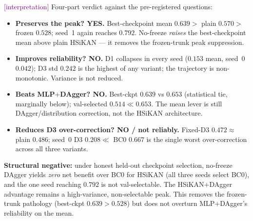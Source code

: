 \documentclass[11pt]{article}
\newcommand{\interp}{\textcolor{purple}{[interpretation]}}
\begin{document}
\interp{} Four-part verdict against the pre-registered questions:
\begin{itemize}[nosep]
\item \textbf{Preserves the peak? YES.} Best-checkpoint mean $0.639>$ plain $0.570>$ frozen $0.528$; seed~1 again
reaches $0.792$. No-freeze \emph{raises} the best-checkpoint mean above plain HSiKAN --- it removes the frozen-trunk
peak suppression.
\item \textbf{Improves reliability? NO.} D1 collapses in every seed ($0.153$ mean, seed~0 $0.042$); D3 std $0.242$
is the highest of any variant; the trajectory is non-monotonic. Variance is not reduced.
\item \textbf{Beats MLP$+$DAgger? NO.} Best-ckpt $0.639$ vs $0.653$ (statistical tie, marginally below);
val-selected $0.514\ll0.653$. The mean lever is still DAgger/distribution correction, not the HSiKAN architecture.
\item \textbf{Reduces D3 over-correction? NO / not reliably.} Fixed-D3 $0.472\approx$ plain $0.486$; seed~0 D3
$0.208\ll$ BC0 $0.667$ is the single worst over-correction across all three variants.
\end{itemize}
\textbf{Structural negative:} under honest held-out checkpoint selection, no-freeze DAgger yields \emph{zero} net
benefit over BC0 for HSiKAN (all three seeds select BC0), and the one seed reaching $0.792$ is not val-selectable.
The HSiKAN$+$DAgger advantage remains a high-variance, non-selectable peak. This removes the frozen-trunk pathology
(best-ckpt $0.639>0.528$) but does not overturn MLP$+$DAgger's reliability on the mean.

\end{document}
